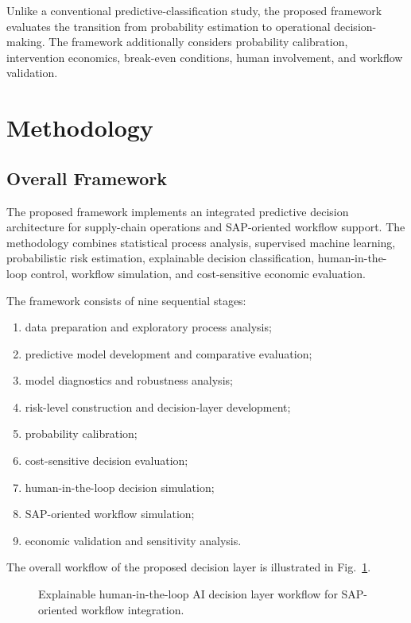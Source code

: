 \documentclass[11pt,a4paper]{article}
\begin{document}
Unlike a conventional predictive-classification study, the proposed framework evaluates the transition from probability estimation to operational decision-making. The framework additionally considers probability calibration, intervention economics, break-even conditions, human involvement, and workflow validation.
\section{Methodology}

\subsection{Overall Framework}

The proposed framework implements an integrated predictive decision architecture for supply-chain operations and SAP-oriented workflow support. The methodology combines statistical process analysis, supervised machine learning, probabilistic risk estimation, explainable decision classification, human-in-the-loop control, workflow simulation, and cost-sensitive economic evaluation.

The framework consists of nine sequential stages:
\begin{enumerate}
    \item data preparation and exploratory process analysis;
    \item predictive model development and comparative evaluation;
    \item model diagnostics and robustness analysis;
    \item risk-level construction and decision-layer development;
    \item probability calibration;
    \item cost-sensitive decision evaluation;
    \item human-in-the-loop decision simulation;
    \item SAP-oriented workflow simulation;
    \item economic validation and sensitivity analysis.
\end{enumerate}

The overall workflow of the proposed decision layer is illustrated in Fig.~\ref{fig:decision_pipeline}.

\begin{figure}[htbp]
\centering

\caption{Explainable human-in-the-loop AI decision layer workflow for SAP-oriented workflow integration.}
\label{fig:decision_pipeline}
\end{figure}
\end{document}
